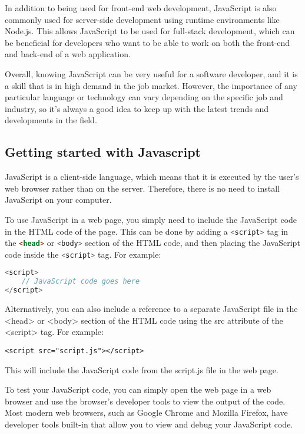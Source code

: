 {In addition to being used for front-end web development, JavaScript is also commonly used for server-side development using runtime environments like Node.js. This allows JavaScript to be used for full-stack development, which can be beneficial for developers who want to be able to work on both the front-end and back-end of a web application.

Overall, knowing JavaScript can be very useful for a software developer, and it is a skill that is in high demand in the job market. However, the importance of any particular language or technology can vary depending on the specific job and industry, so it's always a good idea to keep up with the latest trends and developments in the field.

\subsection{Getting started with Javascript}
JavaScript is a client-side language, which means that it is executed by the user's web browser rather than on the server. Therefore, there is no need to install JavaScript on your computer.

To use JavaScript in a web page, you simply need to include the JavaScript code in the HTML code of the page. This can be done by adding a \lstinline[language=Javascript]{<script>}
tag in the \lstinline[language=HTML]{<head>} or \lstinline[language=Javascript]{<body>} section of the HTML code, and then placing the JavaScript code inside the \lstinline[language=Javascript]{<script>} tag. For example:

\begin{lstlisting}[language=Javascript, numbers=none, caption=sample script tag]
<script>
    // JavaScript code goes here
</script>
\end{lstlisting}

Alternatively, you can also include a reference to a separate JavaScript file in the <head> or <body> section of the HTML code using the src attribute of the <script> tag. For example:

\begin{verbatim}
<script src="script.js"></script>
\end{verbatim}
This will include the JavaScript code from the script.js file in the web page.

To test your JavaScript code, you can simply open the web page in a web browser and use the browser's developer tools to view the output of the code. Most modern web browsers, such as Google Chrome and Mozilla Firefox, have developer tools built-in that allow you to view and debug your JavaScript code.

}

